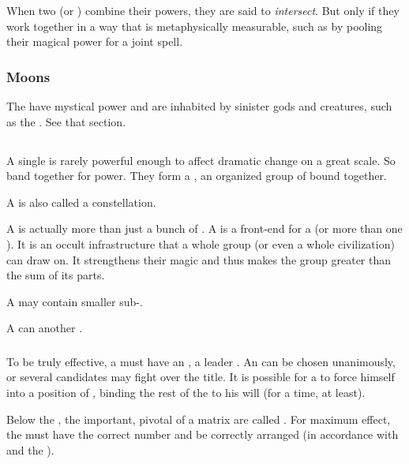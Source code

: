 When two \nexuses{} (or \vertices) combine their powers, they are said to \emph{intersect}.
But only if they work together in a way that is metaphysically measurable, such as by pooling their magical power for a joint spell. 





\subsubsection{Moons}
The  have mystical power and are inhabited by sinister gods and creatures, such as the .
See that section.









\subsection{\Matrix}
A single \vertex is rarely powerful enough to affect dramatic change on a great scale. 
So \vertices{} band together for power. 
They form a \nexus, an organized group of \vertices{} bound together. 

A \nexus{} is also called a constellation. 

A \nexus{} is actually more than just a bunch of \vertices. 
A \nexus{} is a front-end for a \dweomer{} (or more than one \dweomer). 
It is an occult infrastructure that a whole group (or even a whole civilization) can draw on. 
It strengthens their magic and thus makes the group greater than the sum of its parts. 

A \nexus{} may contain smaller sub-\nexuses. 

A \nexus{} can  another \nexus. 





\subsubsection{\Apex}
\index{\apex}
To be truly effective, a \nexus{} must have an \apex, a leader \vertex. An \apex{} can be chosen unanimously, or several candidates may fight over the title. It is possible for a \vertex{} to force himself into a position of \apex, binding the rest of the \nexus{} to his will (for a time, at least). 

\index{\cardinalpoint}
Below the \apex, the important, pivotal \vertices{} of a matrix are called \cardinalpoints. 
For maximum effect, the \cardinalpoints must have the correct number and be correctly arranged (in accordance with  and the ). 





